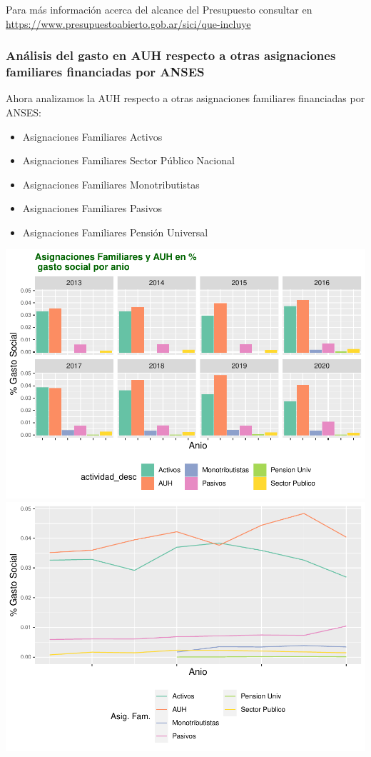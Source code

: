 \documentclass[
  12,
]{article}
\providecommand{\tightlist}{%
  \setlength{\itemsep}{0pt}\setlength{\parskip}{0pt}}
\begin{document}
Para más información acerca del alcance del Presupuesto consultar en
\url{https://www.presupuestoabierto.gob.ar/sici/que-incluye}

\hypertarget{anuxe1lisis-del-gasto-en-auh-respecto-a-otras-asignaciones-familiares-financiadas-por-anses}{%
\subsubsection{Análisis del gasto en AUH respecto a otras asignaciones
familiares financiadas por
ANSES}\label{anuxe1lisis-del-gasto-en-auh-respecto-a-otras-asignaciones-familiares-financiadas-por-anses}}

Ahora analizamos la AUH respecto a otras asignaciones familiares
financiadas por ANSES:

\begin{itemize}
\tightlist
\item
  Asignaciones Familiares Activos
\item
  Asignaciones Familiares Sector Público Nacional
\item
  Asignaciones Familiares Monotributistas
\item
  Asignaciones Familiares Pasivos
\item
  Asignaciones Familiares Pensión Universal
\end{itemize}

\includegraphics[width=0.8\linewidth]{Grupo4_Final_files/figure-latex/graficos_presu_2-1}
\includegraphics[width=0.8\linewidth]{Grupo4_Final_files/figure-latex/graficos_presu_2-2}
\end{document}
